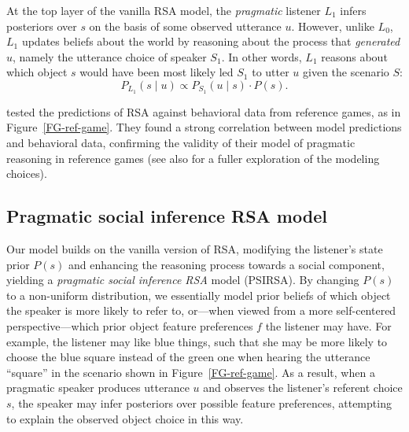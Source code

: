 \documentclass[10pt,a4paper]{article}
\begin{document}
At the top layer of the vanilla RSA model, the \emph{pragmatic} listener $L_1$ infers posteriors over $s$ on the basis of some observed utterance $u$.
However, unlike $L_0$, $L_1$ updates beliefs about the world by reasoning about the process that \emph{generated} $u$, namely the utterance choice of speaker $S_1$.
In other words, $L_1$ reasons about which object $s$ would have been most likely led $S_1$ to utter $u$ given the scenario $S$:
\begin{equation}
P_{L_{1}}(s \mid u) \propto P_{S_{1}}(u \mid s) \cdot P(s).
\end{equation}


 tested the predictions of RSA against behavioral data from reference games, as in Figure~\ref{FG-ref-game}.
They found a strong correlation between model predictions and behavioral data, confirming the validity of their model of pragmatic reasoning in reference games (see also  for a fuller exploration of the modeling choices).


\subsection{Pragmatic social inference RSA model}

Our model builds on the vanilla version of RSA, modifying the listener's state prior $P(s)$ and enhancing the reasoning process towards a social component, yielding a \emph{pragmatic social inference RSA} model (PSIRSA). %
By changing $P(s)$ to a non-uniform distribution, we essentially model prior beliefs of which object the speaker is more likely to refer to, or---when viewed from a more self-centered perspective---which prior object feature preferences $f$ the listener may have. 
For example, the listener may like blue things, such that she may be more likely to choose the blue square instead of the green one when hearing the utterance ``square'' in the scenario shown in Figure~\ref{FG-ref-game}.
As a result, when a pragmatic speaker produces utterance $u$ and observes the listener's referent choice $s$, the speaker may infer posteriors over possible feature preferences, attempting to explain the observed object choice in this way.
\end{document}
